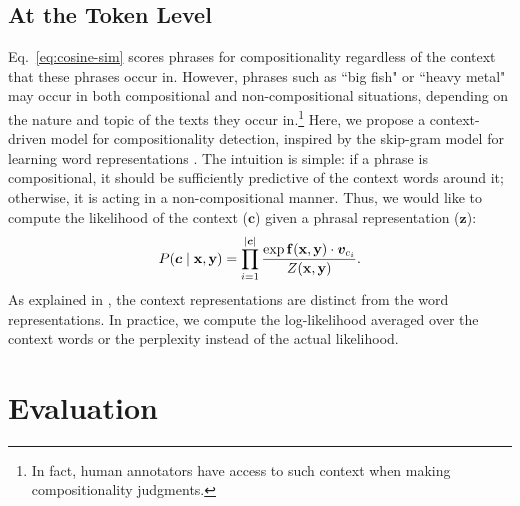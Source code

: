 \documentclass[11pt,letterpaper]{article}
\newcommand{\bX}{{\bf x}}
\newcommand{\bY}{{\bf y}}
\newcommand{\bF}{{\bf f}}
\begin{document}
\subsection{At the Token Level}
\label{sec:context}

Eq.~\ref{eq:cosine-sim} scores phrases for compositionality regardless of the context that these phrases occur in. 
However, phrases such as ``big fish" or ``heavy metal" may occur in both compositional and non-compositional situations, depending on the nature and topic of the texts they occur in.\footnote{In fact, human annotators have access to such context when making compositionality judgments.}
Here, we propose a context-driven model for compositionality detection, inspired by the skip-gram model for learning word representations \cite{Mikolov2013b}. 
The intuition is simple: if a phrase is compositional, it should be sufficiently predictive of the context words around it; otherwise, it is acting in a non-compositional manner. 
Thus, we would like to compute the likelihood of the context ($\boldsymbol{c}$) given a phrasal representation ($\boldsymbol{z}$):
\begin{align}
	P(\boldsymbol{c} \mid \bX,\bY) = \prod_{i=1}^{|\boldsymbol{c}|} \frac{\exp \bF(\bX,\bY) \cdot \boldsymbol{v}_{c_i}}{Z(\bX,\bY)}.
	\label{eq:likelihood}
\end{align}
As explained in , the context representations are distinct from the word representations.
In practice, we compute the log-likelihood averaged over the context words or the perplexity instead of the actual likelihood. 

\section{Evaluation}
\label{sec:experiments}
\end{document}
